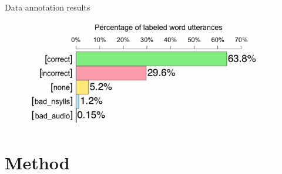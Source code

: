 \documentclass[xcolor={dvipsnames}]{beamer}
\begin{document}
\begin{frame}{Data annotation results}

	\begin{figure}
		\centering
		\includegraphics[width=\textwidth]{../overallJudgments-withLabels}
		\label{fig:results:overallbars}
	\end{figure}
\end{frame}

\section{Method}
\end{document}
